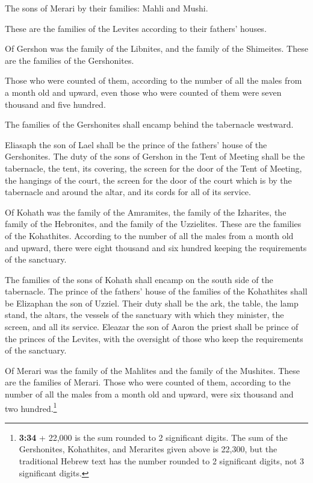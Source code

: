  The sons of Merari by their families: Mahli and Mushi.

These are the families of the Levites according to their fathers'
houses.

 Of Gershon was the family of the Libnites, and the
family of the Shimeites. These are the families of the Gershonites.

 Those who were counted of them, according to the number
of all the males from a month old and upward, even those who were
counted of them were seven thousand and five hundred.

 The families of the Gershonites shall encamp behind the
tabernacle westward.

 Eliasaph the son of Lael shall be the prince of the
fathers' house of the Gershonites.  The duty of the sons
of Gershon in the Tent of Meeting shall be the tabernacle, the tent, its
covering, the screen for the door of the Tent of Meeting,
 the hangings of the court, the screen for the door of
the court which is by the tabernacle and around the altar, and its cords
for all of its service.

 Of Kohath was the family of the Amramites, the family of
the Izharites, the family of the Hebronites, and the family of the
Uzzielites. These are the families of the Kohathites. 
According to the number of all the males from a month old and upward,
there were eight thousand and six hundred keeping the requirements of
the sanctuary.

 The families of the sons of Kohath shall encamp on the
south side of the tabernacle.  The prince of the fathers'
house of the families of the Kohathites shall be Elizaphan the son of
Uzziel.  Their duty shall be the ark, the table, the lamp
stand, the altars, the vessels of the sanctuary with which they
minister, the screen, and all its service.  Eleazar the
son of Aaron the priest shall be prince of the princes of the Levites,
with the oversight of those who keep the requirements of the sanctuary.

 Of Merari was the family of the Mahlites and the family
of the Mushites. These are the families of Merari.  Those
who were counted of them, according to the number of all the males from
a month old and upward, were six thousand and two hundred.\footnote{\textbf{3:34}
  + 22,000 is the sum rounded to 2 significant digits. The sum of the
  Gershonites, Kohathites, and Merarites given above is 22,300, but the
  traditional Hebrew text has the number rounded to 2 significant
  digits, not 3 significant digits.}


